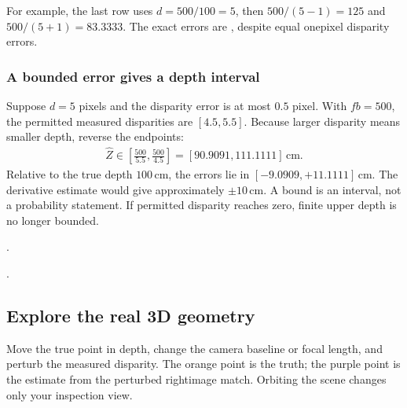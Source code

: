 \documentclass[letterpaper,11pt,english,openany,oneside]{jupyterBook}
\begin{document}
\sphinxAtStartPar
For example, the last row uses \(d=500/100=5\), then \(500/(5-1)=125\) and \(500/(5+1)=83.3333\). The exact errors are , despite equal one\sphinxhyphen{}pixel disparity errors.


\subsubsection{A bounded error gives a depth interval}
\label{\detokenize{lectures/lecture04/stereo:a-bounded-error-gives-a-depth-interval}}
\sphinxAtStartPar
Suppose \(d=5\) pixels and the disparity error is at most \(0.5\) pixel. With \(fb=500\), the permitted measured disparities are \([4.5,5.5]\). Because larger disparity means smaller depth, reverse the endpoints:
\begin{equation*}
\begin{split}\widehat Z\in
\left[\frac{500}{5.5},\frac{500}{4.5}\right]
=[90.9091,111.1111]\,\mathrm{cm}.\end{split}
\end{equation*}
\sphinxAtStartPar
Relative to the true depth \(100\,\mathrm{cm}\), the errors lie in \([-9.0909,+11.1111]\,\mathrm{cm}\). The derivative estimate would give approximately \(\pm10\,\mathrm{cm}\). A bound is an interval, not a probability statement. If permitted disparity reaches zero, finite upper depth is no longer bounded.

\sphinxAtStartPar
{} {\hyperref[\detokenize{lectures/lecture04/quiz-workbook:quiz-4-q1}]{}}.

\sphinxAtStartPar
{} {\hyperref[\detokenize{lectures/lecture04/quiz-workbook:quiz-5-q1}]{}}.


\subsection{Explore the real 3D geometry}
\label{\detokenize{lectures/lecture04/stereo:explore-the-real-3d-geometry}}\label{\detokenize{lectures/lecture04/stereo:stereo-explorer}}
\sphinxAtStartPar
Move the true point in depth, change the camera baseline or focal length, and perturb the measured disparity. The orange point is the truth; the purple point is the estimate from the perturbed right\sphinxhyphen{}image match. Orbiting the scene changes only your inspection view.
\end{document}
